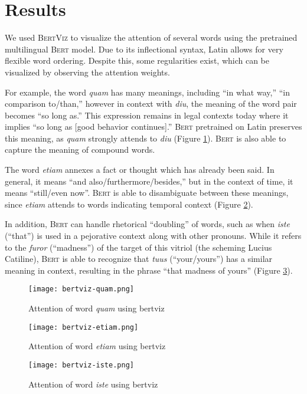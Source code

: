 \documentclass[11pt,a4paper]{article}
\begin{document}
\section{Results}

We used \textsc{BertViz} to visualize the attention of several words using the pretrained multilingual \textsc{Bert} model.
Due to its inflectional syntax, Latin allows for very flexible word ordering.
Despite this, some regularities exist, which can be visualized by observing the attention weights.

For example, the word \textit{quam} has many meanings, including ``in what way,'' ``in comparison to/than,'' however in context with \textit{diu}, the meaning of the word pair becomes ``so long as.''
This expression remains in legal contexts today where it implies ``so long as [good behavior continues].''
\textsc{Bert} pretrained on Latin preserves this meaning, as \textit{quam} strongly attends to \textit{diu} (Figure \ref{fig:quam}).
\textsc{Bert} is also able to capture the meaning of compound words.

The word \textit{etiam} annexes a fact or thought which has already been said.
In general, it means ``and also/furthermore/besides,''
but in the context of time, it means ``still/even now''. 
\textsc{Bert} is able to disambiguate between these meanings,
since \textit{etiam} attends to words indicating temporal context (Figure \ref{fig:etiam}).

In addition, \textsc{Bert} can handle rhetorical ``doubling'' of words,
such as when \textit{iste} (``that'') is used in a pejorative context along with other pronouns.
While it refers to the \textit{furor} (``madness'') of the target of this vitriol (the scheming Lucius Catiline), 
\textsc{Bert} is able to recognize that \textit{tuus} (``your/yours'') has a similar meaning in context, 
resulting in the phrase ``that madness of yours'' (Figure \ref{fig:iste}).

\begin{figure}
  \texttt{[image: bertviz-quam.png]}
  \caption{Attention of word \textit{quam} using bertviz}
  \label{fig:quam}
\end{figure}

\begin{figure}
  \texttt{[image: bertviz-etiam.png]}
  \caption{Attention of word \textit{etiam} using bertviz}
  \label{fig:etiam}
\end{figure}
\begin{figure}
  \texttt{[image: bertviz-iste.png]}
  \caption{Attention of word \textit{iste} using bertviz}
  \label{fig:iste}
\end{figure}
\end{document}
